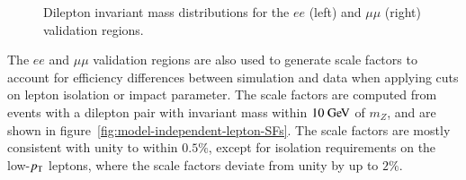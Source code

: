 \begin{figure}[htbp]
  \caption{Dilepton invariant mass distributions for the $ee$ (left) and $\mu\mu$ (right) validation regions.}
  \label{fig:model-independent-VR-dilepton}
\end{figure}

The $ee$ and $\mu\mu$ validation regions are also used to generate scale factors to account for efficiency
differences between simulation and data when applying cuts on lepton isolation or impact parameter. The scale factors are computed from events with a dilepton pair with invariant mass within $10 \GeV$ of $m_Z$, and are shown in figure~\ref{fig:model-independent-lepton-SFs}. The scale factors are mostly consistent with unity to within $0.5\%$, except for isolation requirements on the low-$p_{\text{T}}$ leptons, where the scale factors deviate from unity by up to $2\%$. 

